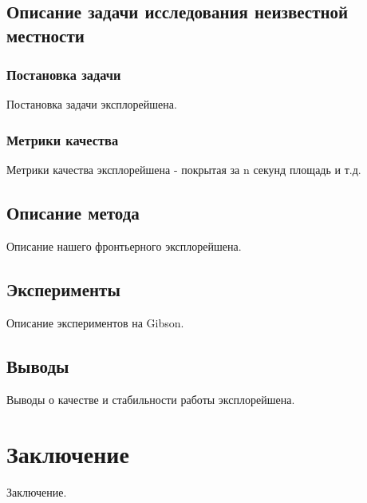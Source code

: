 \documentclass{mipt-thesis-ms}
\begin{document}
	\section{Описание задачи исследования неизвестной местности}
	
	\subsection{Постановка задачи}
	
	Постановка задачи эксплорейшена.
	
	\subsection{Метрики качества}
	
	Метрики качества эксплорейшена - покрытая за n секунд площадь и т.д.
	
	\section{Описание метода}
	
	Описание нашего фронтьерного эксплорейшена.
	
	\section{Эксперименты}
	
	Описание экспериментов на Gibson.
	
	\section{Выводы}
	
	Выводы о качестве и стабильности работы эксплорейшена.
	
	
	\chapter{Заключение}
	
	Заключение.
	
	\printbibliography
\end{document}
